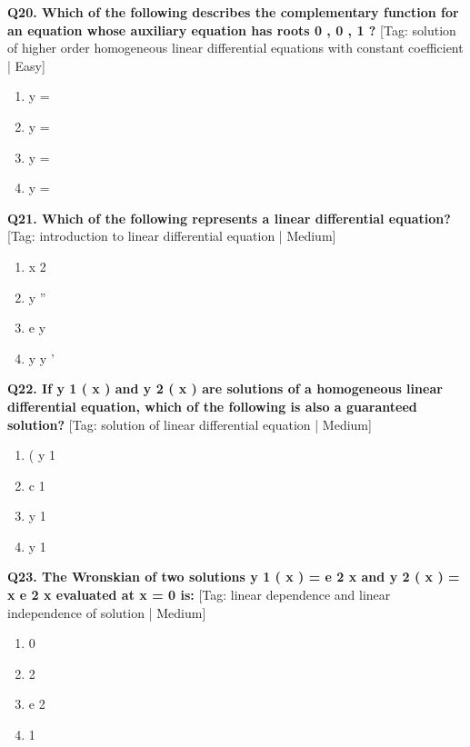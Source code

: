 \noindent\textbf{Q20. Which of the following describes the complementary function for an equation whose auxiliary equation has roots 0 , 0 , 1 ?} \hfill [Tag: solution of higher order homogeneous linear differential equations with constant coefficient | Easy]
\begin{enumerate}[label=(\alph*),topsep=2pt,itemsep=1pt,partopsep=0pt,parsep=0pt]
    \item {{y =}}
    \item {{y =}}
    \item {{y =}}
    \item {{y =}}
\end{enumerate}
\vspace{2mm}

\noindent\textbf{Q21. Which of the following represents a linear differential equation?} \hfill [Tag: introduction to linear differential equation | Medium]
\begin{enumerate}[label=(\alph*),topsep=2pt,itemsep=1pt,partopsep=0pt,parsep=0pt]
    \item {{x 2}}
    \item {{y ''}}
    \item {{e y}}
    \item {{y y '}}
\end{enumerate}
\vspace{2mm}

\noindent\textbf{Q22. If y 1 ( x ) and y 2 ( x ) are solutions of a homogeneous linear differential equation, which of the following is also a guaranteed solution?} \hfill [Tag: solution of linear differential equation | Medium]
\begin{enumerate}[label=(\alph*),topsep=2pt,itemsep=1pt,partopsep=0pt,parsep=0pt]
    \item {{( y 1}}
    \item {{c 1}}
    \item {{y 1}}
    \item {{y 1}}
\end{enumerate}
\vspace{2mm}

\noindent\textbf{Q23. The Wronskian of two solutions y 1 ( x ) = e 2 x and y 2 ( x ) = x e 2 x evaluated at x = 0 is:} \hfill [Tag: linear dependence and linear independence of solution | Medium]
\begin{enumerate}[label=(\alph*),topsep=2pt,itemsep=1pt,partopsep=0pt,parsep=0pt]
    \item {{0}}
    \item {{2}}
    \item {{e 2}}
    \item {{1}}
\end{enumerate}
\vspace{2mm}

